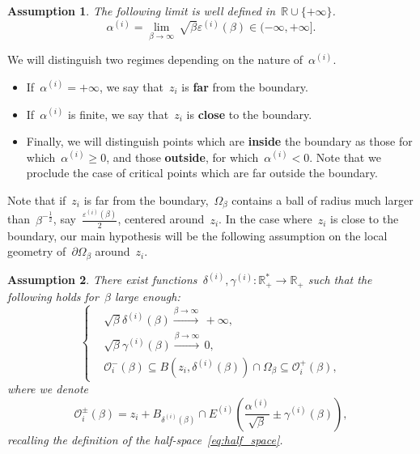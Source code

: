 \documentclass[10pt]{article}
\newcommand{\R}{\mathbb{R}}
\newcommand{\1}{\mathbbm 1}
\newcommand{\epsBoundary}[1]{\varepsilon^{(#1)}} %
\newcommand{\deltaRadius}[1]{\delta^{(#1)}} %
\newcommand{\epsLimit}[1]{\alpha^{(#1)}} %
\newcommand{\localNeighborhood}[2][]{\mathcal{O}_{#2}^{#1}} %
\newcommand{\gammaPerturbation}[1]{\gamma^{(#1)}}
\newcommand{\halfSpace}[1]{E^{(#1)}}
\newtheorem{hypothesis}{Assumption}
\begin{document}
    \begin{hypothesis}
    The following limit is well defined in~$\R\cup\{+\infty\}$.
    \begin{equation}
        \label{eq:epsLimit_definition}
        \tag{\bf H0}
        \epsLimit{i} =\underset{\beta\to\infty}{\lim}\, \sqrt\beta\epsBoundary{i}(\beta) \in (-\infty,+\infty].
    \end{equation}
    \end{hypothesis}

    We will distinguish two regimes depending on the nature of~$\epsLimit{i}$.
    \begin{itemize}
        \item If~$\epsLimit{i}= +\infty$, we say that~$z_i$ is {\bf far} from the boundary.
        \item If~$\epsLimit{i}$ is finite, we say that~$z_i$ is {\bf close} to the boundary.
        \item Finally, we will distinguish points which are {\bf inside} the boundary as those for which~$\epsLimit{i}\geq0$, and those {\bf outside}, for which~$\epsLimit{i}<0$. Note that we proclude the case of critical points which are far outside the boundary.
    \end{itemize}
    Note that if~$z_i$ is far from the boundary,~$\Omega_\beta$ contains a ball of radius much larger than~$\beta^{-\frac12}$, say~$\frac{\epsBoundary{i}(\beta)}2$, centered around~$z_i$.
    In the case where~$z_i$ is close to the boundary, our main hypothesis will be the following assumption on the local geometry of~$\partial\Omega_\beta$ around~$z_i$.

    \begin{hypothesis}     
        There exist functions~$\deltaRadius{i},\gammaPerturbation{i}:\R_+^*\to\R_+$ such that the following holds for~$\beta$ large enough:
        \begin{equation}
            \label{eq:domain_sandwich_inclusion}
            \tag{\bf H1}
            \left\{\begin{aligned}
                &\sqrt\beta\deltaRadius{i}(\beta)\overset{\beta\to\infty}{\longrightarrow}\,+\infty,\\
                &\sqrt\beta\gammaPerturbation{i}(\beta)\overset{\beta\to\infty}{\longrightarrow}\,0,\\
                &\localNeighborhood[-]{i}(\beta) \subseteq B(z_i,\deltaRadius{i}(\beta))\cap\Omega_\beta \subseteq \localNeighborhood[+]{i}(\beta),
            \end{aligned}\right.
        \end{equation}
        where we denote
        \begin{equation}
            \label{eq:capped_balls}
            \localNeighborhood[\pm]{i}(\beta) = z_i + B_{\deltaRadius{i}(\beta)} \cap \halfSpace{i}\left(\frac{\epsLimit{i}}{\sqrt\beta}\pm\gammaPerturbation{i}(\beta)\right),
        \end{equation}
        recalling the definition of the half-space~\eqref{eq:half_space}.
    \end{hypothesis}
\end{document}
